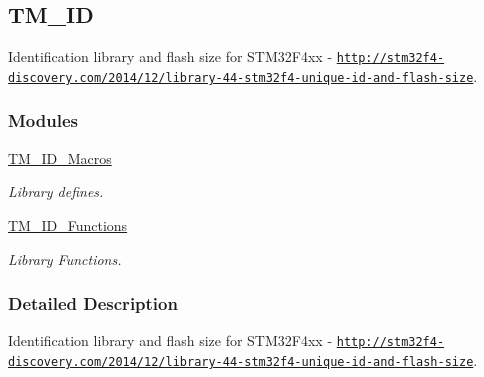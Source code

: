 \hypertarget{group___t_m___i_d}{}\subsection{T\+M\+\_\+\+I\+D}
\label{group___t_m___i_d}


Identification library and flash size for S\+T\+M32\+F4xx -\/ \href{http://stm32f4-discovery.com/2014/12/library-44-stm32f4-unique-id-and-flash-size}{\tt http\+://stm32f4-\/discovery.\+com/2014/12/library-\/44-\/stm32f4-\/unique-\/id-\/and-\/flash-\/size}.  


\subsubsection*{Modules}
\begin{DoxyCompactItemize}
\item 
\hyperlink{group___t_m___i_d___macros}{T\+M\+\_\+\+I\+D\+\_\+\+Macros}
\begin{DoxyCompactList}\small\item\em Library defines. \end{DoxyCompactList}\item 
\hyperlink{group___t_m___i_d___functions}{T\+M\+\_\+\+I\+D\+\_\+\+Functions}
\begin{DoxyCompactList}\small\item\em Library Functions. \end{DoxyCompactList}\end{DoxyCompactItemize}


\subsubsection{Detailed Description}
Identification library and flash size for S\+T\+M32\+F4xx -\/ \href{http://stm32f4-discovery.com/2014/12/library-44-stm32f4-unique-id-and-flash-size}{\tt http\+://stm32f4-\/discovery.\+com/2014/12/library-\/44-\/stm32f4-\/unique-\/id-\/and-\/flash-\/size}. 

